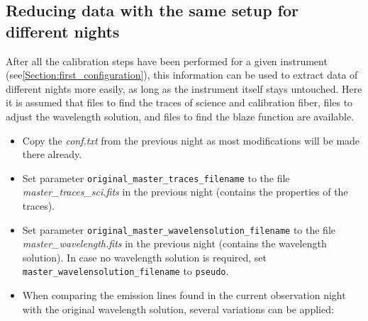 \documentclass[10pt,a4paper]{article}
\begin{document}
\subsection{Reducing data with the same setup for different nights}
\label{Section:further_configuration}
After all the calibration steps have been performed for a given instrument (see\ref{Section:first_configuration}), this information can be used to extract data of different nights more easily, as long as the instrument itself stays untouched. Here it is assumed that files to find the traces of science and calibration fiber, files to adjust the wavelength solution, and files to find the blaze function are available.

\begin{itemize}
  \item Copy the \textit{conf.txt} from the previous night as most modifications will be made there already.
  
  \item Set parameter \verb|original_master_traces_filename| to the file \textit{master\_traces\_sci.fits} in the previous night (contains the properties of the traces).
  
  \item Set parameter \verb|original_master_wavelensolution_filename| to the file \textit{master\_wavelength.fits} in the previous night (contains the wavelength solution). In case no wavelength solution is required, set \verb|master_wavelensolution_filename| to \verb|pseudo|.
  
  \item When comparing the emission lines found in the current observation night with  the original wavelength solution, several variations can be applied:
  

\end{itemize}
\end{document}
